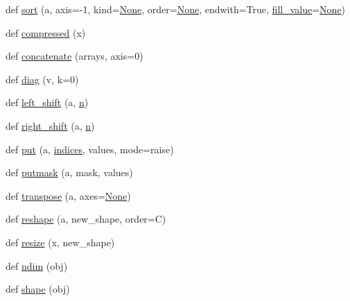 \begin{DoxyCompactItemize}
\item 
def \hyperlink{namespacenumpy_1_1ma_1_1core_a28496f13c5d3890313d8025f4a85910d}{sort} (a, axis=-\/1, kind=\hyperlink{namespacenumpy_1_1ma_1_1core_a647ee1848dfa3692fe35a663a2aa40b3}{None}, order=\hyperlink{namespacenumpy_1_1ma_1_1core_a647ee1848dfa3692fe35a663a2aa40b3}{None}, endwith=True, \hyperlink{namespacenumpy_1_1ma_1_1core_ae299ee1b3a1e5865fcdc6ca98dbe24d2}{fill\+\_\+value}=\hyperlink{namespacenumpy_1_1ma_1_1core_a647ee1848dfa3692fe35a663a2aa40b3}{None})
\item 
def \hyperlink{namespacenumpy_1_1ma_1_1core_a2b4b4b816bb642b0b523350e0857a255}{compressed} (x)
\item 
def \hyperlink{namespacenumpy_1_1ma_1_1core_a9188e3406ca26ea14043aca2be3b43c2}{concatenate} (arrays, axis=0)
\item 
def \hyperlink{namespacenumpy_1_1ma_1_1core_ac0e8938dbdc84e0aaeb80b38c549fe98}{diag} (v, k=0)
\item 
def \hyperlink{namespacenumpy_1_1ma_1_1core_a4f5d44a5c0905b233f56e464119180ca}{left\+\_\+shift} (a, \hyperlink{namespacenumpy_a352663c52853d2754274407d5cae2832}{n})
\item 
def \hyperlink{namespacenumpy_1_1ma_1_1core_ace97fe28919c884179e2856520737c66}{right\+\_\+shift} (a, \hyperlink{namespacenumpy_a352663c52853d2754274407d5cae2832}{n})
\item 
def \hyperlink{namespacenumpy_1_1ma_1_1core_a2b3ba13aeb614f7dab7926ce0c8c1b74}{put} (a, \hyperlink{namespacenumpy_1_1ma_1_1core_a1cba93d768a61f51e74e5c5f7e8233f7}{indices}, values, mode=\textquotesingle{}raise\textquotesingle{})
\item 
def \hyperlink{namespacenumpy_1_1ma_1_1core_af8f7ccab53689a71415c28b92704735d}{putmask} (a, mask, values)
\item 
def \hyperlink{namespacenumpy_1_1ma_1_1core_a20525945e912d4049c170965fc404ed4}{transpose} (a, axes=\hyperlink{namespacenumpy_1_1ma_1_1core_a647ee1848dfa3692fe35a663a2aa40b3}{None})
\item 
def \hyperlink{namespacenumpy_1_1ma_1_1core_a2dcb6de99dd499e704550a249eaf4d6d}{reshape} (a, new\+\_\+shape, order=\textquotesingle{}C\textquotesingle{})
\item 
def \hyperlink{namespacenumpy_1_1ma_1_1core_a174d001981edb710268b41cf5985ed1d}{resize} (x, new\+\_\+shape)
\item 
def \hyperlink{namespacenumpy_1_1ma_1_1core_a75b64c8b180060696d536301a4d3532d}{ndim} (obj)
\item 
def \hyperlink{namespacenumpy_1_1ma_1_1core_adfb120ad3d95b1520434ad69cafaf5d7}{shape} (obj)

\end{DoxyCompactItemize}
